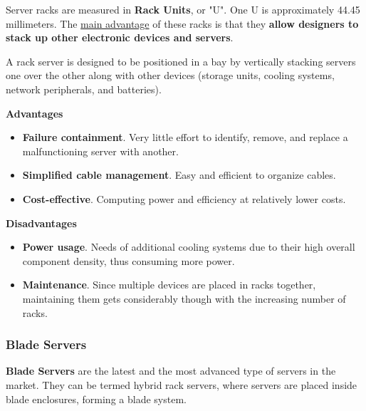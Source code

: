 \documentclass[a4paper]{article}
\newcommand{\definition}[1]{\textcolor{Red3}{\textbf{#1}}\index{#1}}
\newcommand{\highspace}{\vspace{1.2em}\noindent}
\begin{document}
    \highspace
    Server racks are measured in \definition{Rack Units}, or "U". One U is approximately 44.45 millimeters. The \underline{main advantage} of these racks is that they \textbf{allow designers to stack up other electronic devices and servers}.

    \highspace
    A rack server is designed to be positioned in a bay by vertically stacking servers one over the other along with other devices (storage units, cooling systems, network peripherals, and batteries).

    \begin{flushleft}
        \textcolor{Green3}{ \textbf{Advantages}}
    \end{flushleft}
    \begin{itemize}[label=]
        \item \textbf{Failure containment}. Very little effort to identify, remove, and replace a malfunctioning server with another.

        \item \textbf{Simplified cable management}. Easy and efficient to organize cables.

        \item \textbf{Cost-effective}. Computing power and efficiency at relatively lower costs.
    \end{itemize}

    \newpage

    \begin{flushleft}
        \textcolor{Red2}{ \textbf{Disadvantages}}
    \end{flushleft}
    \begin{itemize}[label=]
        \item \textbf{Power usage}. Needs of additional cooling systems due to their high overall component density, thus consuming more power.

        \item \textbf{Maintenance}. Since multiple devices are placed in racks together, maintaining them gets considerably though with the increasing number of racks.
    \end{itemize}

    \newpage

    \subsubsection*{Blade Servers}

    \definition{Blade Servers} are the latest and the most advanced type of servers in the market. They can be termed hybrid rack servers, where servers are placed inside blade enclosures, forming a blade system.
\end{document}
